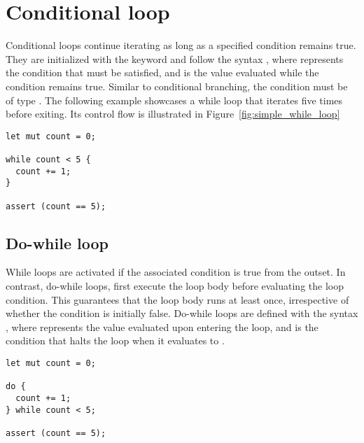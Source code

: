\section{Conditional loop}%
\label{sec:while_loop}

Conditional loops continue iterating as long as a specified condition remains
true. They are initialized with the keyword  and follow the syntax
, where  represents the condition that must be
satisfied, and  is the value evaluated while the condition remains
true. Similar to conditional branching, the condition  must be of type
. The following example showcases a while loop that iterates five
times before exiting. Its control flow is illustrated in
Figure~\ref{fig:simple_while_loop}

\begin{lstlisting}[style=coloredverbatim, caption=Simple while loop, label=lst:simple_while_loop]
let mut count = 0;

while count < 5 {
  count += 1;
}

assert (count == 5);
\end{lstlisting}



\subsection{Do-while loop}
\label{sec:do_while_loop}

While loops are activated if the associated condition is true from the outset.
In contrast, do-while loops, first execute the loop body before evaluating the
loop condition. This guarantees that the loop body runs at least once,
irrespective of whether the condition is initially false. Do-while loops are
defined with the syntax , where  represents the
value evaluated upon entering the loop, and  is the condition that
halts the loop when it evaluates to .

\begin{lstlisting}[style=coloredverbatim, caption=Simple do while loop, label=lst:simple_do_while_loop]
let mut count = 0;

do {
  count += 1;
} while count < 5;

assert (count == 5);
\end{lstlisting}



